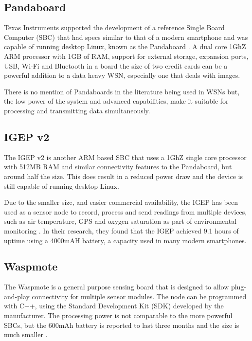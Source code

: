 \subsection{Pandaboard}

Texas Instruments supported the development of a reference Single Board Computer (SBC) that had specs similar to that of a modern smartphone and was capable of running desktop Linux, known as the Pandaboard \cite{instruments2012pandaboard}. A dual core 1GhZ ARM processor with 1GB of RAM, support for external storage, expansion ports, USB, Wi-Fi and Bluetooth in a board the size of two credit cards can be a powerful addition to a data heavy WSN, especially one that deals with images.

There is no mention of Pandaboards in the literature being used in WSNs but, the low power of the system and advanced capabilities, make it suitable for processing and transmitting data simultaneously. 
	
\subsection{IGEP v2}

The IGEP v2 is another ARM based SBC that uses a 1GhZ single core processor with 512MB RAM and similar connectivity features to the Pandaboard, but around half the size. This does result in a reduced power draw and the device is still capable of running desktop Linux.

Due to the smaller size, and easier commercial availability, the IGEP has been used as a sensor node to record, process and send readings from multiple devices, such as air temperature, GPS and oxygen saturation as part of environmental monitoring \cite{Resch}. In their research, they found that the IGEP achieved 9.1 hours of uptime using a 4000mAH battery, a capacity used in many modern smartphones.

\subsection{Waspmote}
The Waspmote is a general purpose sensing board that is designed to allow plug-and-play connectivity for multiple sensor modules. The node can be programmed with C++, using the Standard Development Kit (SDK) developed by the manufacturer. The processing power is not comparable to the more powerful SBCs, but the 600mAh battery is reported to last three months and the size is much smaller \cite{Lib}.

